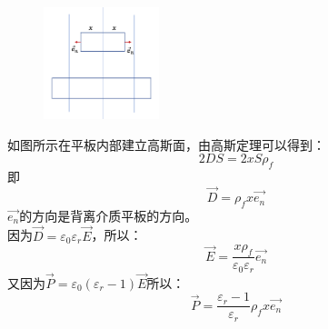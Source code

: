 \documentclass[cn,hazy,blue,14pt,normal]{elegantnote}
\numberwithin{equation}{section}
\begin{document}
\begin{figure}
	\includegraphics[width=0.3\textwidth]{image/电介质高斯定理例题.png}
\end{figure}
如图所示在平板内部建立高斯面，由高斯定理可以得到：
$$
2 D S = 2 x S \rho_f
$$
即
$$
\vec{D} = \rho_f x \vec{e_n}
$$
$\vec{e_n}$的方向是背离介质平板的方向。\\
因为$\vec{D} = \varepsilon_0 \varepsilon_r \vec{E}$，所以：
$$
\vec{E} = \frac{x \rho_f}{\varepsilon_0 \varepsilon_r}\vec{e_n}
$$
又因为$\vec{P} = \varepsilon_0(\varepsilon_r - 1) \vec{E}$所以：
$$\vec{P} = \frac{\varepsilon_r - 1}{\varepsilon_r} \rho_f x \vec{e_n}$$
\end{document}
